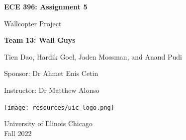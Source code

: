 \documentclass[12pt]{article}
\begin{document}
    \begin{titlepage}
        \begin{center}
            \vspace*{1cm}
            \Huge\textbf{ECE 396: Assignment 5}

                \vspace{0.5cm}
                \LARGE Wallcopter Project
    
            \vspace{1.5cm}
            \textbf{Team 13: Wall Guys}

                \vspace{0.5cm}
                Tien Dao, Hardik Goel, Jaden Mossman, and Anand Pudi

                \Large
                Sponsor: Dr Ahmet Enis Cetin

                Instructor: Dr Matthew Alonso

                \LARGE

            \vfill             
            \texttt{[image: resources/uic\_logo.png]}

            \vspace{0.8cm}
            University of Illinois Chicago\\
            Fall 2022
                
        \end{center}
    \end{titlepage}

    \tableofcontents

    \newpage
\end{document}
